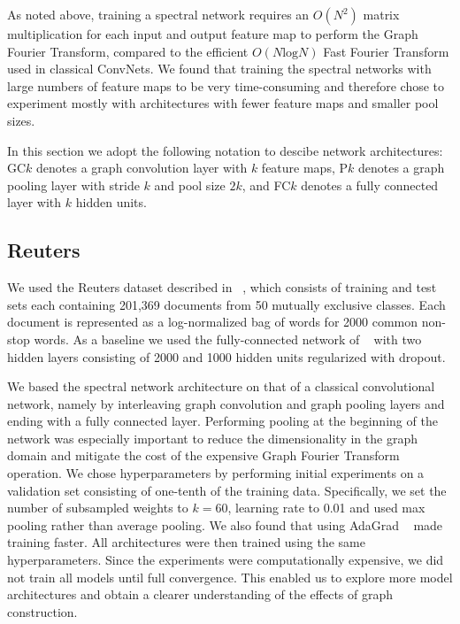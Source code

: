 As noted above, training a spectral network requires an $O(N^2)$ matrix multiplication for each input and output feature map to perform the Graph Fourier Transform, compared to the efficient $O(N \text{log} N)$ Fast Fourier Transform used in classical ConvNets. We found that training the spectral networks with large numbers of feature maps to be very time-consuming and therefore chose to experiment mostly with architectures with fewer feature maps and smaller pool sizes. 

In this section we adopt the following notation to descibe network architectures: GC$k$ denotes a graph convolution layer with $k$ feature maps, P$k$ denotes a graph pooling layer with stride $k$ and pool size $2k$, and FC$k$ denotes a fully connected layer with $k$ hidden units.

\subsection{Reuters}

We used the Reuters dataset described in ~\cite{JMLR:v15:srivastava14a}, which consists of training and test sets each containing 201,369 documents from 50 mutually exclusive classes. Each document is represented as a log-normalized bag of words for 2000 common non-stop words. As a baseline we used the fully-connected network of ~\cite{JMLR:v15:srivastava14a} with two hidden layers consisting of 2000 and 1000 hidden units regularized with dropout.  

We based the spectral network architecture on that of a classical convolutional network, namely by interleaving graph convolution and graph pooling layers and ending with a fully connected layer. Performing pooling at the beginning of the network was especially important to reduce the dimensionality in the graph domain and mitigate the cost of the expensive Graph Fourier Transform operation.  We chose hyperparameters by performing initial experiments on a validation set consisting of one-tenth of the training data. Specifically, we set the number of subsampled weights to $k=60$, learning rate to 0.01 and used max pooling rather than average pooling. We also found that using AdaGrad ~\cite{adagrad} made training faster. All architectures were then trained using the same hyperparameters.
Since the experiments were computationally expensive, we did not train all models until full convergence. This enabled us to explore more model architectures and obtain a clearer understanding of the effects of graph construction.  

